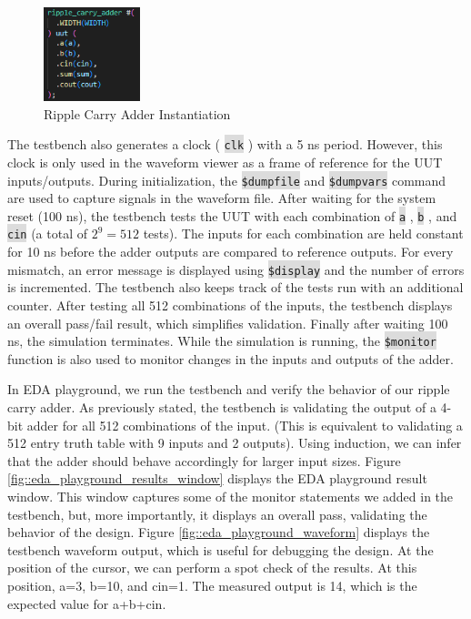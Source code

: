 \documentclass[fleqn]{article}
\newcommand{\code}[1]{%
	\colorbox{Gainsboro}{\texttt{#1}}%
}
\begin{document}
\begin{enumerate}
		 \begin{figure}[H]
		 	\centerline{\includegraphics[width=0.25\textwidth]{ripple_carry_adder_inst.png}}
			\caption{Ripple Carry Adder Instantiation}
			\label{fig::ripple_carry_adder_inst}
		 \end{figure}
		 
		 The testbench also generates a clock (\code{clk}) with a 5 ns period. However, this clock is only used in the waveform viewer as a frame of reference for the UUT inputs/outputs. During initialization, the \code{\$dumpfile} and \code{\$dumpvars} command are used to capture signals in the waveform file. After waiting for the system reset (100 ns), the testbench tests the UUT with each combination of \code{a}, \code{b}, and \code{cin} (a total of $2^9=512$ tests). The inputs for each combination are held constant for 10 ns before the adder outputs are compared to reference outputs. For every mismatch, an error message is displayed using \code{\$display} and the number of errors is incremented. The testbench also keeps track of the tests run with an additional counter. After testing all 512 combinations of the inputs, the testbench displays an overall pass/fail result, which simplifies validation. Finally after waiting 100 ns, the simulation terminates. While the simulation is running, the \code{\$monitor} function is also used to monitor changes in the inputs and outputs of the adder.
		  
		 In EDA playground, we run the testbench and verify the behavior of our ripple carry adder. As previously stated, the testbench is validating the output of a 4-bit adder for all 512 combinations of the input. (This is equivalent to validating a 512 entry truth table with 9 inputs and 2 outputs). Using induction, we can infer that the adder should behave accordingly for larger input sizes. Figure \ref{fig::eda_playground_results_window} displays the EDA playground result window. This window captures some of the monitor statements we added in the testbench, but, more importantly, it displays an overall pass, validating the behavior of the design. Figure \ref{fig::eda_playground_waveform} displays the testbench waveform output, which is useful for debugging the design. At the position of the cursor, we can perform a spot check of the results. At this position, a=3, b=10, and cin=1. The measured output is 14, which is the expected value for a+b+cin.
		 

\end{enumerate}
\end{document}
